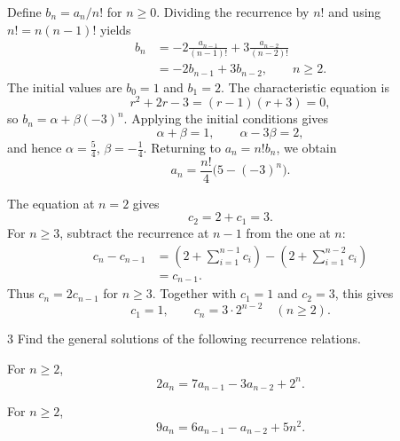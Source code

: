 \documentclass[11pt,oneside]{article}
\begin{document}
\begin{solution}
\begin{problemsubparts}
    \item Define $b_n=a_n/n!$ for $n\geq0$. Dividing the recurrence by $n!$ and using $n!=n(n-1)!$ yields
    \[
    \begin{aligned}
        b_n&=-2\frac{a_{n-1}}{(n-1)!}
             +3\frac{a_{n-2}}{(n-2)!}\\
           &=-2b_{n-1}+3b_{n-2},\qquad n\geq2.
    \end{aligned}
    \]
    The initial values are $b_0=1$ and $b_1=2$. The characteristic equation is
    \[
        r^2+2r-3=(r-1)(r+3)=0,
    \]
    so $b_n=\alpha+\beta(-3)^n$. Applying the initial conditions gives
    \[
        \alpha+\beta=1,\qquad \alpha-3\beta=2,
    \]
    and hence $\alpha=\frac54$, $\beta=-\frac14$. Returning to $a_n=n!b_n$, we obtain
    \[
        a_n=\frac{n!}{4}\bigl(5-(-3)^n\bigr).
    \]

    \item The equation at $n=2$ gives
    \[
        c_2=2+c_1=3.
    \]
    For $n\geq3$, subtract the recurrence at $n-1$ from the one at $n$:
    \[
    \begin{aligned}
        c_n-c_{n-1}
        &=\left(2+\sum_{i=1}^{n-1}c_i\right)
          -\left(2+\sum_{i=1}^{n-2}c_i\right)\\
        &=c_{n-1}.
    \end{aligned}
    \]
    Thus $c_n=2c_{n-1}$ for $n\geq3$. Together with $c_1=1$ and $c_2=3$, this gives
    \[
        c_1=1,\qquad c_n=3\cdot2^{n-2}\quad(n\geq2).
    \]
\end{problemsubparts}
\end{solution}

\begin{problem}{3}
Find the general solutions of the following recurrence relations.
\begin{problemsubparts}
    \item For $n\geq2$,
    \[
        2a_n=7a_{n-1}-3a_{n-2}+2^n.
    \]

    \item For $n\geq2$,
    \[
        9a_n=6a_{n-1}-a_{n-2}+5n^2.
    \]
\end{problemsubparts}
\end{problem}
\end{document}
